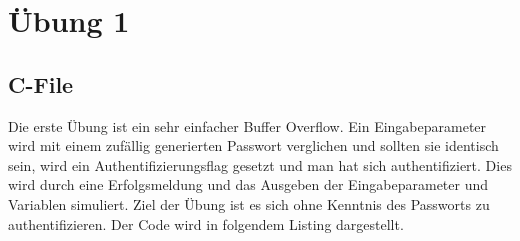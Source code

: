 \section{Übung 1}
\subsection{C-File}
Die erste Übung ist ein sehr einfacher Buffer Overflow. Ein Eingabeparameter wird mit einem zufällig generierten Passwort verglichen und sollten sie identisch sein, wird ein Authentifizierungsflag gesetzt und man hat sich \glqq{}authentifiziert\grqq{}. Dies wird durch eine Erfolgsmeldung und das Ausgeben der Eingabeparameter und Variablen simuliert. Ziel der Übung ist es sich ohne Kenntnis des Passworts zu authentifizieren.
Der Code wird in folgendem Listing dargestellt.

